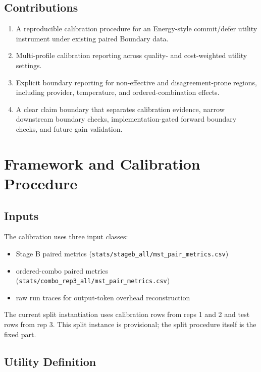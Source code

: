 \documentclass[11pt,a4paper]{article}
\begin{document}
\subsection{Contributions}

\begin{enumerate}
  \item A reproducible calibration procedure for an Energy-style commit/defer utility instrument under existing paired Boundary data.
  \item Multi-profile calibration reporting across quality- and cost-weighted utility settings.
  \item Explicit boundary reporting for non-effective and disagreement-prone regions, including provider, temperature, and ordered-combination effects.
  \item A clear claim boundary that separates calibration evidence, narrow downstream boundary checks, implementation-gated forward boundary checks, and future gain validation.
\end{enumerate}

\section{Framework and Calibration Procedure}
\label{sec:framework}

\subsection{Inputs}
\label{sec:inputs}

The calibration uses three input classes:
\begin{itemize}
  \item Stage B paired metrics (\texttt{stats/stageb\_all/mst\_pair\_metrics.csv})
  \item ordered-combo paired metrics (\texttt{stats/combo\_rep3\_all/mst\_pair\_metrics.csv})
  \item raw run traces for output-token overhead reconstruction
\end{itemize}

The current split instantiation uses calibration rows from reps 1 and 2 and test rows from rep 3. This split instance is provisional; the split procedure itself is the fixed part.

\subsection{Utility Definition}
\label{sec:utility}
\end{document}
